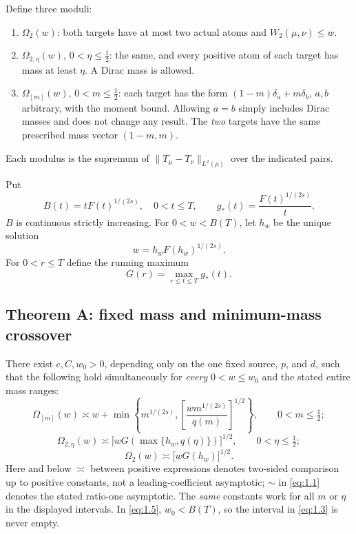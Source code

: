 Define three moduli:
\begin{enumerate}
  \item $\Omega_2(w)$: both targets have at most two actual atoms and $W_2(\mu,\nu)\le w$.
  \item $\Omega_{2,\eta}(w)$, $0<\eta\le\tfrac12$: the same, and every positive atom of each target has mass at least $\eta$. A Dirac mass is allowed.
  \item $\Omega_{[m]}(w)$, $0<m\le\tfrac12$: each target has the form $(1-m)\delta_a+m\delta_b$, $a,b$ arbitrary, with the moment bound. Allowing $a=b$ simply includes Dirac masses and does not change any result. The \emph{two} targets have the same prescribed mass vector $(1-m,m)$.
\end{enumerate}
Each modulus is the supremum of $\|T_\mu-T_\nu\|_{L^2(\rho)}$ over the indicated pairs.

Put
\[
  B(t)=tF(t)^{1/(2s)},\quad 0<t\le T,
  \qquad g_*(t)=\frac{F(t)^{1/(2s)}}{t}.
\]
$B$ is continuous strictly increasing. For $0<w<B(T)$, let $h_w$ be the unique solution
\begin{equation}
  w=h_w F(h_w)^{1/(2s)}.
  \tag{1.2}\label{eq:1.2}
\end{equation}
For $0<r\le T$ define the running maximum
\begin{equation}
  G(r)=\max_{r\le t\le T}g_*(t).
  \tag{1.3}\label{eq:1.3}
\end{equation}

\subsection*{Theorem A: fixed mass and minimum-mass crossover}

There exist $c,C,w_0>0$, depending only on the one fixed source, $p$, and $d$, such that the following hold simultaneously for \emph{every} $0<w\le w_0$ and the stated entire mass ranges:
\begin{equation}
  \Omega_{[m]}(w)
  \asymp w+\min\!\left\{m^{1/(2s)},
    \left[\frac{w m^{1/(2s)}}{q(m)}\right]^{1/2}\right\},
  \qquad 0<m\le\tfrac12;
  \tag{1.4}\label{eq:1.4}
\end{equation}
\begin{equation}
  \Omega_{2,\eta}(w)
  \asymp\bigl[wG(\max\{h_w,q(\eta)\})\bigr]^{1/2},
  \qquad 0<\eta\le\tfrac12;
  \tag{1.5}\label{eq:1.5}
\end{equation}
\begin{equation}
  \Omega_2(w)\asymp\bigl[wG(h_w)\bigr]^{1/2}.
  \tag{1.6}\label{eq:1.6}
\end{equation}
Here and below $\asymp$ between positive expressions denotes two-sided comparison up to positive constants, not a leading-coefficient asymptotic; $\sim$ in \eqref{eq:1.1} denotes the stated ratio-one asymptotic. The \emph{same} constants work for all $m$ or $\eta$ in the displayed intervals. In \eqref{eq:1.5}, $w_0<B(T)$, so the interval in \eqref{eq:1.3} is never empty.

